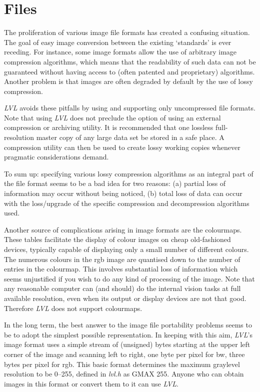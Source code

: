 \documentclass[11pt,twoside,english,a4paper]{article}
\begin{document}
\section{Files}
The proliferation of various image file formats has created a confusing situation.
The goal of easy image conversion between the existing `standards' is ever receding. 
For instance, some image formats allow the use of arbitrary image compression algorithms,
which means that the readability of such data can not be guaranteed
without having access to (often patented and proprietary) algorithms.
Another problem is that images are often degraded by default 
by the use of lossy compression.

\emph{LVL} avoids these pitfalls by using and supporting only uncompressed file formats. 
Note that using \emph{LVL} does not preclude the option
of using an external compression or archiving utility. 
It is recommended that one lossless full-resolution master copy 
of any large data set be stored in a safe place.
A compression utility can then be used to create lossy working copies whenever
pragmatic considerations demand.

To sum up: specifying various lossy compression
algorithms as an integral part of the file format seems to be a bad idea 
for two reasons: (a) partial loss of information may occur without being noticed,
(b) total loss of data can occur with the loss/upgrade of the specific 
compression and decompression algorithms used. 

Another source of complications arising in image formats
are the colourmaps. These tables facilitate the display of colour
images on cheap old-fashioned devices, typically capable of displaying
only a small number of different colours. The numerous
colours in the rgb image are quantised down to the number of
entries in the colourmap. This involves substantial loss of information
which seems unjustified if you wish to do any kind of processing of
the image. Note that any reasonable computer can (and should) do the internal
vision tasks at full available resolution, even when its output or
display devices are not that good. Therefore \emph{LVL} does not support
colourmaps. 

In the long term, the best answer to the image file portability problems
seems to be to adopt the simplest possible representation. 
In keeping with this aim, \emph{LVL}'s image format uses 
a simple stream of (unsigned) bytes starting at the upper left corner
of the image and scanning left to right, one byte per pixel for bw, three
bytes per pixel for rgb. This basic format determines the maximum
graylevel resolution to be 0--255, defined in \emph{lvl.h} as GMAX 255.
Anyone who can obtain images in this format or convert them to it can use \emph{LVL}.
\end{document}

